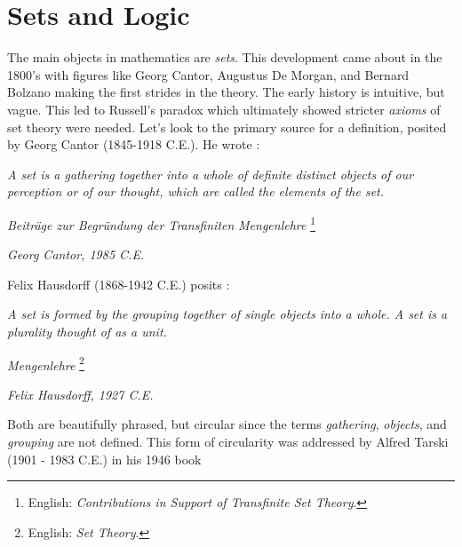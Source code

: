     \section{Sets and Logic}
        The main objects in mathematics are \textit{sets}. This development came
        about in the 1800's with figures like Georg Cantor,
        Augustus De Morgan, and Bernard
        Bolzano making the first strides in the theory.
        The early history is intuitive, but vague. This led to Russell's
        paradox which
        ultimately showed stricter \textit{axioms} of set theory were needed.
        Let's look to the primary source for a definition, posited by Georg
        Cantor (1845-1918 C.E.). He wrote \cite{Cantor1895}:
        \begin{center}
            \textit{A set is a gathering together into a whole of definite}
            \textit{distinct objects of our perception or of our thought, which}
            \textit{are called the elements of the set.}
            \par\hfill
            \textit{Beitr\"{a}ge zur Begr\"{u}ndung der Transfiniten}
            \textit{Mengenlehre}%
            \footnote{%
                English:
                \textit{Contributions in Support of Transfinite Set Theory}.%
            }
            \par\hfill
            \textit{Georg Cantor, 1985 C.E.}
        \end{center}
        Felix Hausdorff (1868-1942 C.E.) posits
        \cite[p.~11]{HausdorffSetTheory}:
        \begin{center}
            \textit{A set is formed by the grouping together of single objects}
            \textit{into a whole. A set is a plurality thought of as a unit.}
            \par\hfill
            \textit{Mengenlehre}%
            \footnote{%
                English:
                \textit{Set Theory}.%
            }
            \par\hfill
            \textit{Felix Hausdorff, 1927 C.E.}
        \end{center}
        Both are beautifully phrased, but circular since the terms
        \textit{gathering}, \textit{objects}, and \textit{grouping} are not
        defined. This form of circularity was addressed by Alfred
        Tarski (1901 - 1983 C.E.) in his 1946 book
